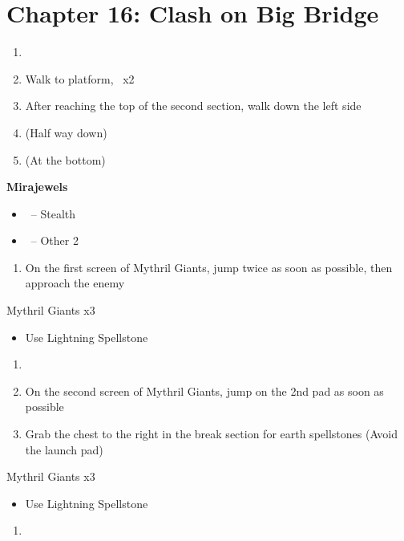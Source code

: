 \chapter{Chapter 16: Clash on Big Bridge}
\begin{enumerate}
    \item \cs\
    \item Walk to platform, \cs\ x2
    \item After reaching the top of the second section, walk down the left side
    \item \pickup{Elixir} (Half way down)
    \item {} (At the bottom)
\end{enumerate}
\begin{menu}
\textbf{Mirajewels}
    \begin{itemize}
        \item \reynn\ -- Stealth
        \item \lann\ -- Other 2
    \end{itemize}
\end{menu}
\begin{enumerate}[resume]
    \item On the first screen of Mythril Giants, jump twice as soon as possible, then approach the enemy
\end{enumerate}
\begin{battle}[]{Mythril Giants x3}
    \begin{itemize}
        \item Use Lightning Spellstone
    \end{itemize}
\end{battle}
\begin{enumerate}[resume]
    \item {}
    \item On the second screen of Mythril Giants, jump on the 2nd pad as soon as possible
    \item Grab the chest to the right in the break section for earth spellstones (Avoid the launch pad)
\end{enumerate}
\begin{battle}[]{Mythril Giants x3}
    \begin{itemize}
        \item Use Lightning Spellstone
    \end{itemize}
\end{battle}
\begin{enumerate}[resume]
    \item {}
\end{enumerate}
